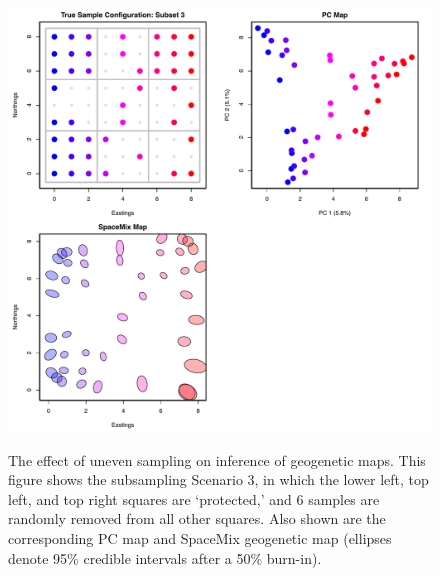 \documentclass[10pt,letterpaper]{article}
\begin{document}
\begin{figure}
\centering
	{\includegraphics[width=\textwidth]{../figs/sims/grid_subsamp3.pdf}}
	\caption{The effect of uneven sampling on inference of geogenetic maps.  
			This figure shows the subsampling Scenario 3, 
			in which the lower left, top left, and top right squares are `protected,'
			and 6 samples are randomly removed from all other squares.
			Also shown are the corresponding PC map and 
			SpaceMix geogenetic map 
			(ellipses denote 95\% credible intervals after a 50\% burn-in).}\label{sfig:uneven_sampling_grid_subsamp3}
\end{figure}
\end{document}
